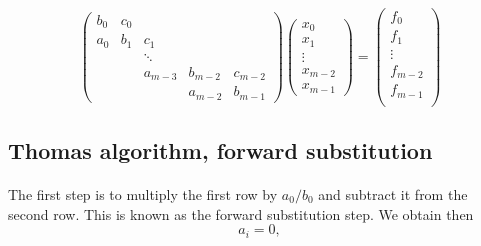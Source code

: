 \documentclass[%
oneside,                 %
final,                   %
10pt]{article}
\begin{document}
\paragraph{}
\[
\left( \begin{array}{ccccc}
        b_0 & c_0 &        &         &         \\
	a_0 &  b_1 &  c_1    &         &         \\
	   &    & \ddots  &         &         \\
	      &	    & a_{m-3} & b_{m-2} & c_{m-2} \\
	         &    &         & a_{m-2} & b_{m-1}
   \end{array} \right)
\left( \begin{array}{c}
       x_0     \\
       x_1     \\
       \vdots  \\
       x_{m-2} \\
       x_{m-1}
   \end{array} \right)=\left( \begin{array}{c}
       f_0     \\
       f_1     \\
       \vdots  \\
       f_{m-2} \\
       f_{m-1} \\
   \end{array} \right)
\]



\subsection*{Thomas algorithm, forward substitution}

\paragraph{}
The first step is to multiply the first row by $a_0/b_0$ and subtract it from the second row.  This is known as the forward substitution step. We obtain then
\[
	a_i = 0,
\]
\end{document}
